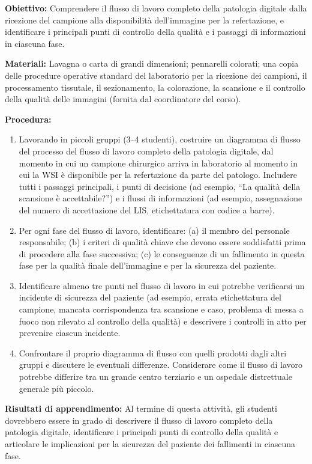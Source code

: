 \textbf{Obiettivo:} Comprendere il flusso di lavoro completo della patologia digitale dalla ricezione del campione alla disponibilità dell'immagine per la refertazione, e identificare i principali punti di controllo della qualità e i passaggi di informazioni in ciascuna fase.

\textbf{Materiali:} Lavagna o carta di grandi dimensioni; pennarelli colorati; una copia delle procedure operative standard del laboratorio per la ricezione dei campioni, il processamento tissutale, il sezionamento, la colorazione, la scansione e il controllo della qualità delle immagini (fornita dal coordinatore del corso).

\textbf{Procedura:}
\begin{enumerate}
  \item Lavorando in piccoli gruppi (3--4 studenti), costruire un diagramma di flusso del processo del flusso di lavoro completo della patologia digitale, dal momento in cui un campione chirurgico arriva in laboratorio al momento in cui la WSI è disponibile per la refertazione da parte del patologo. Includere tutti i passaggi principali, i punti di decisione (ad esempio, ``La qualità della scansione è accettabile?'') e i flussi di informazioni (ad esempio, assegnazione del numero di accettazione del LIS, etichettatura con codice a barre).
  \item Per ogni fase del flusso di lavoro, identificare: (a) il membro del personale responsabile; (b) i criteri di qualità chiave che devono essere soddisfatti prima di procedere alla fase successiva; (c) le conseguenze di un fallimento in questa fase per la qualità finale dell'immagine e per la sicurezza del paziente.
  \item Identificare almeno tre punti nel flusso di lavoro in cui potrebbe verificarsi un incidente di sicurezza del paziente (ad esempio, errata etichettatura del campione, mancata corrispondenza tra scansione e caso, problema di messa a fuoco non rilevato al controllo della qualità) e descrivere i controlli in atto per prevenire ciascun incidente.
  \item Confrontare il proprio diagramma di flusso con quelli prodotti dagli altri gruppi e discutere le eventuali differenze. Considerare come il flusso di lavoro potrebbe differire tra un grande centro terziario e un ospedale distrettuale generale più piccolo.
\end{enumerate}

\textbf{Risultati di apprendimento:} Al termine di questa attività, gli studenti dovrebbero essere in grado di descrivere il flusso di lavoro completo della patologia digitale, identificare i principali punti di controllo della qualità e articolare le implicazioni per la sicurezza del paziente dei fallimenti in ciascuna fase.

